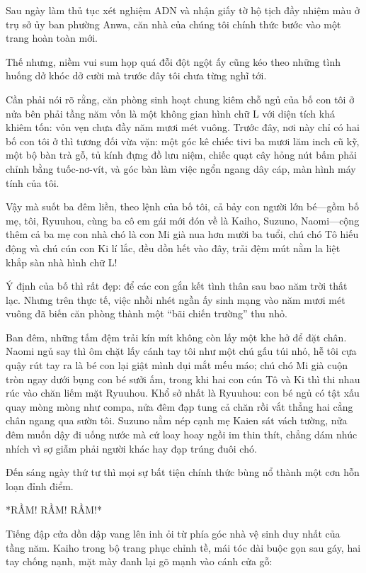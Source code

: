 \documentclass[../main.tex]{subfiles}
\begin{document}

Sau ngày làm thủ tục xét nghiệm ADN và nhận giấy tờ hộ tịch đầy nhiệm màu ở trụ sở ủy ban phường Anwa, căn nhà của chúng tôi chính thức bước vào một trang hoàn toàn mới. 

Thế nhưng, niềm vui sum họp quá đỗi đột ngột ấy cũng kéo theo những tình huống dở khóc dở cười mà trước đây tôi chưa từng nghĩ tới.

Cần phải nói rõ rằng, căn phòng sinh hoạt chung kiêm chỗ ngủ của bố con tôi ở nửa bên phải tầng năm vốn là một không gian hình chữ L với diện tích khá khiêm tốn: vỏn vẹn chưa đầy năm mươi mét vuông. Trước đây, nơi này chỉ có hai bố con tôi ở thì tương đối vừa vặn: một góc kê chiếc tivi ba mươi lăm inch cũ kỹ, một bộ bàn trà gỗ, tủ kính đựng đồ lưu niệm, chiếc quạt cây hỏng nút bấm phải chỉnh bằng tuốc-nơ-vít, và góc bàn làm việc ngổn ngang dây cáp, màn hình máy tính của tôi. 

Vậy mà suốt ba đêm liền, theo lệnh của bố tôi, cả bảy con người lớn bé—gồm bố mẹ, tôi, Ryuuhou, cùng ba cô em gái mới đón về là Kaiho, Suzuno, Naomi—cộng thêm cả ba mẹ con nhà chó là con Mi già nua hơn mười ba tuổi, chú chó Tô hiếu động và chú cún con Ki lí lắc, đều dồn hết vào đây, trải đệm mút nằm la liệt khắp sàn nhà hình chữ L!

Ý định của bố thì rất đẹp: để các con gắn kết tình thân sau bao năm trời thất lạc. Nhưng trên thực tế, việc nhồi nhét ngần ấy sinh mạng vào năm mươi mét vuông đã biến căn phòng thành một ``bãi chiến trường'' thu nhỏ.

Ban đêm, những tấm đệm trải kín mít không còn lấy một khe hở để đặt chân. Naomi ngủ say thì ôm chặt lấy cánh tay tôi như một chú gấu túi nhỏ, hễ tôi cựa quậy rút tay ra là bé con lại giật mình dụi mắt mếu máo; chú chó Mi già cuộn tròn ngay dưới bụng con bé sưởi ấm, trong khi hai con cún Tô và Ki thì thi nhau rúc vào chăn liếm mặt Ryuuhou. Khổ sở nhất là Ryuuhou: con bé ngủ có tật xấu quay mòng mòng như compa, nửa đêm đạp tung cả chăn rồi vắt thẳng hai cẳng chân ngang qua sườn tôi. Suzuno nằm nép cạnh mẹ Kaien sát vách tường, nửa đêm muốn dậy đi uống nước mà cứ loay hoay ngồi im thin thít, chẳng dám nhúc nhích vì sợ giẫm phải người khác hay đạp trúng đuôi chó.

Đến sáng ngày thứ tư thì mọi sự bất tiện chính thức bùng nổ thành một cơn hỗn loạn đỉnh điểm.

*RẦM! RẦM! RẦM!*

Tiếng đập cửa dồn dập vang lên inh ỏi từ phía góc nhà vệ sinh duy nhất của tầng năm. Kaiho trong bộ trang phục chỉnh tề, mái tóc dài buộc gọn sau gáy, hai tay chống nạnh, mặt mày đanh lại gõ mạnh vào cánh cửa gỗ:
\end{document}
